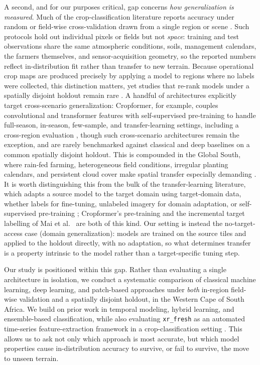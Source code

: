 \documentclass[pdflatex,sn-mathphys]{sn-jnl} %
\begin{document}
A second, and for our purposes critical, gap concerns \emph{how generalization is measured}. Much of the crop-classification literature reports accuracy under random or field-wise cross-validation drawn from a single region or scene \cite{belgiu2016, ltae2020, tempcnn2019, russwurm2018, ieee2017}. Such protocols hold out individual pixels or fields but not \emph{space}: training and test observations share the same atmospheric conditions, soils, management calendars, the farmers themselves, and sensor-acquisition geometry, so the reported numbers reflect in-distribution fit rather than transfer to new terrain. Because operational crop maps are produced precisely by applying a model to regions where no labels were collected, this distinction matters, yet studies that re-rank models under a spatially disjoint holdout remain rare \cite{pankajakshan2025, jin2019, rustowicz2019}. A handful of architectures explicitly target cross-scenario generalization: Cropformer, for example, couples convolutional and transformer features with self-supervised pre-training to handle full-season, in-season, few-sample, and transfer-learning settings, including a cross-region evaluation \cite{cropformer2023}, though such cross-scenario architectures remain the exception, and are rarely benchmarked against classical and deep baselines on a common spatially disjoint holdout. This is compounded in the Global South, where rain-fed farming, heterogeneous field conditions, irregular planting calendars, and persistent cloud cover make spatial transfer especially demanding \cite{begue2020}. It is worth distinguishing this from the bulk of the transfer-learning literature, which adapts a source model to the target domain using target-domain data, whether labels for fine-tuning, unlabeled imagery for domain adaptation, or self-supervised pre-training \cite{ma2024}; Cropformer's pre-training and the incremental target labelling of Mai et al.\ \cite{mai2025} are both of this kind. Our setting is instead the no-target-access case (domain generalization): models are trained on the source tiles and applied to the holdout directly, with no adaptation, so what determines transfer is a property intrinsic to the model rather than a target-specific tuning step.

Our study is positioned within this gap. Rather than evaluating a single architecture in isolation, we conduct a systematic comparison of classical machine learning, deep learning, and patch-based approaches under \emph{both} in-region field-wise validation and a spatially disjoint holdout, in the Western Cape of South Africa. We build on prior work in temporal modeling, hybrid learning, and ensemble-based classification, while also evaluating \texttt{xr\_fresh} as an automated time-series feature-extraction framework in a crop-classification setting \cite{mann2025}. This allows us to ask not only which approach is most accurate, but which model properties cause in-distribution accuracy to survive, or fail to survive, the move to unseen terrain.
\end{document}
